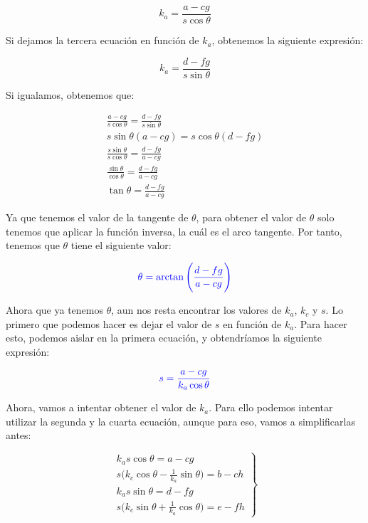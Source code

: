 \documentclass[11pt,a4paper]{article}
\begin{document}
\begin{equation}
\label{simp1}
k_a = \frac{a-cg}{s\cos\theta}
\end{equation}

Si dejamos la tercera ecuación en función de $k_a$, obtenemos
la siguiente expresión:

\begin{equation}
\label{simp2}
k_a = \frac{d-fg}{s\sin\theta}
\end{equation}

Si igualamos, obtenemos que:

\begin{gather*}
\frac{a-cg}{s\cos\theta} = \frac{d-fg}{s\sin\theta} \\
s\sin\theta(a-cg) = s\cos\theta(d-fg) \\
\frac{s\sin\theta}{s\cos\theta} = \frac{d-fg}{a-cg} \\
\frac{\sin\theta}{\cos\theta} = \frac{d-fg}{a-cg} \\
\tan \theta = \frac{d-fg}{a-cg}
\end{gather*}

Ya que tenemos el valor de la tangente de $\theta$, para
obtener el valor de $\theta$ solo tenemos que aplicar
la función inversa, la cuál es el arco tangente. Por tanto,
tenemos que $\theta$ tiene el siguiente valor:

\begin{equation}
\textcolor{blue}{\theta = \arctan \Bigg( \frac{d-fg}{a-cg} \Bigg)}
\end{equation}

Ahora que ya tenemos $\theta$, aun nos resta encontrar los
valores de $k_a$, $k_c$ y $s$. Lo primero que podemos hacer
es dejar el valor de $s$ en función de $k_a$. Para hacer
esto, podemos aislar en la primera ecuación, y obtendríamos
la siguiente expresión:

\begin{equation}
\textcolor{blue}{s = \frac{a-cg}{k_a\cos\theta}}
\end{equation}

Ahora, vamos a intentar obtener el valor de $k_a$. Para
ello podemos intentar utilizar la segunda y la cuarta
ecuación, aunque para eso, vamos a simplificarlas antes:

\begin{equation}
\left.\begin{matrix}
 k_as\cos\theta = a-cg \\
 s\Big(k_c\cos\theta - \frac{1}{k_a}\sin\theta\Big) = b -ch \\
 k_as\sin\theta = d-fg \\
 s\Big(k_c\sin\theta + \frac{1}{k_a}\cos\theta\Big) = e-fh
\end{matrix}\right\}
\end{equation}
\end{document}
